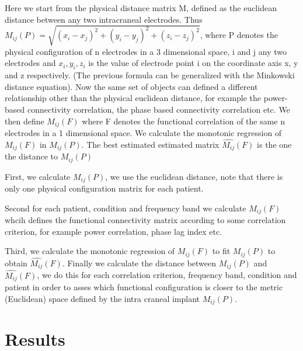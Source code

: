 \documentclass[11pt, onecolumn]{article}
\begin{document}
Here we start from the physical distance matrix M, defined as the euclidean distance between any two intracraneal electrodes. Thus $M_{ij}(P) = \sqrt{(x_i - x_j)^2 + (y_i - y_j)^2 + (z_i - z_j)^2}$, where P denotes the physical configuration of n electrodes in a 3 dimensional space, i and j any two electrodes and $x_i,y_i,z_i$ is the
value of electrode point i on the coordinate axis x, y and z respectively. (The previous formula can be generalized with the Minkowski distance equation).
Now the same set of objects can defined a different relationship other than the physical euclidean distance, for example the power-based connectivity correlation, the phase based connectivity correlation etc. We then define $M_{ij}(F)$  where F denotes the functional correlation of the same n electrodes in a 1 dimensional space.
We calculate the monotonic regression of $M_{ij}(F)$ in $M_{ij}(P)$. The best estimated  estimated matrix $\hat{M_{ij}}(F)$ is the one the distance to $M_{ij}(P)$

First, we calculate $M_{ij}(P)$, we use the euclidean distance, note that there is only one physical configuration matrix for each patient.

Second for each patient, condition and frequency band we calculate $M_{ij}(F)$ whcih defines the functional connectivity matrix according to some correlation criterion, for example power correlation, phase lag index etc.

Third, we calculate the monotonic regression of  $M_{ij}(F)$ to fit $M_{ij}(P)$ to obtain $\hat{M_{ij}}(F)$. Finally we calculate the distance between $M_{ij}(P)$ and $\hat{M_{ij}}(F)$, we do this for each correlation criterion, frequency band, condition and patient in order to asses which functional configuration is closer to the metric (Euclidean) space defined by the intra craneal implant $M_{ij}(P)$.




\section{Results}
\label{se:results}




%

\end{document}
